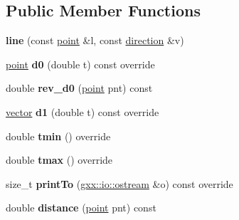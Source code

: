\subsection*{Public Member Functions}
\begin{DoxyCompactItemize}
\item 
{\bfseries line} (const \hyperlink{classmalgo_1_1vector2}{point} \&l, const \hyperlink{classmalgo_1_1unit__vector2}{direction} \&v)\hypertarget{classgxx_1_1geom2_1_1line_a8e6df43baa58693474f1152d75d20904}{}\label{classgxx_1_1geom2_1_1line_a8e6df43baa58693474f1152d75d20904}

\item 
\hyperlink{classmalgo_1_1vector2}{point} {\bfseries d0} (double t) const override\hypertarget{classgxx_1_1geom2_1_1line_a6517fa46b2fb12183138d4a0d0444e8b}{}\label{classgxx_1_1geom2_1_1line_a6517fa46b2fb12183138d4a0d0444e8b}

\item 
double {\bfseries rev\+\_\+d0} (\hyperlink{classmalgo_1_1vector2}{point} pnt) const \hypertarget{classgxx_1_1geom2_1_1line_ac61eb1b6a0c7aa60dea8dbc158556041}{}\label{classgxx_1_1geom2_1_1line_ac61eb1b6a0c7aa60dea8dbc158556041}

\item 
\hyperlink{classmalgo_1_1vector2}{vector} {\bfseries d1} (double t) const override\hypertarget{classgxx_1_1geom2_1_1line_acb91989c411c850a762a60ffa25a0515}{}\label{classgxx_1_1geom2_1_1line_acb91989c411c850a762a60ffa25a0515}

\item 
double {\bfseries tmin} () override\hypertarget{classgxx_1_1geom2_1_1line_af7ffe87dc366567d88723be737055240}{}\label{classgxx_1_1geom2_1_1line_af7ffe87dc366567d88723be737055240}

\item 
double {\bfseries tmax} () override\hypertarget{classgxx_1_1geom2_1_1line_af3d543e7b8ede8cccb9febede48a25ac}{}\label{classgxx_1_1geom2_1_1line_af3d543e7b8ede8cccb9febede48a25ac}

\item 
size\+\_\+t {\bfseries print\+To} (\hyperlink{classgxx_1_1io_1_1ostream}{gxx\+::io\+::ostream} \&o) const override\hypertarget{classgxx_1_1geom2_1_1line_a1ed9c8bf2862b6474dc0dfe43289d353}{}\label{classgxx_1_1geom2_1_1line_a1ed9c8bf2862b6474dc0dfe43289d353}

\item 
double {\bfseries distance} (\hyperlink{classmalgo_1_1vector2}{point} pnt) const \hypertarget{classgxx_1_1geom2_1_1line_ade5b131f157bf9805756db3e8f524438}{}\label{classgxx_1_1geom2_1_1line_ade5b131f157bf9805756db3e8f524438}


\end{DoxyCompactItemize}
